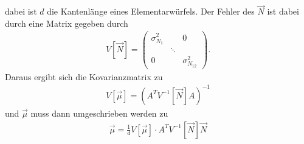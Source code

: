 dabei ist $d$ die Kantenlänge eines Elementarwürfels.
Der Fehler des $\vec{N}$ ist dabei durch eine Matrix gegeben durch
\begin{align}
	V[\vec{N}]=
	\begin{pmatrix}
		\sigma^2_{N_1} &  & 0\\
		 & \ddots & \\
		0 &  &\sigma^2_{N_{12}}	
	\end{pmatrix}.
\end{align}
Daraus ergibt sich die Kovarianzmatrix zu
\begin{align}
	V[\vec{\mu}]=\left(A^TV^{-1}[\vec{N}]A\right)^{-1}
	\label{eq:KleinsteQuadrateFehler}
\end{align}
und $\vec{\mu}$ muss dann umgeschrieben werden zu
\begin{align}
	\vec{\mu}=\frac{1}{d}V[\vec{\mu}]\cdot A^T V^{-1}[\vec{N}] \vec{N}
	\label{eq:KleinsteQuadrate}
\end{align}
\newpage
